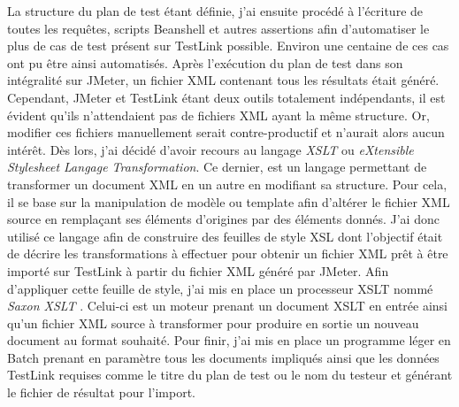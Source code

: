 	La structure du plan de test étant définie, j'ai ensuite procédé à l'écriture de toutes les requêtes, scripts Beanshell et autres assertions afin d'automatiser le plus de cas de test présent sur TestLink possible. Environ une centaine de ces cas ont pu être ainsi automatisés. Après l'exécution du plan de test dans son intégralité sur JMeter, un fichier XML contenant tous les résultats était généré. \\
	
	 Cependant, JMeter et TestLink étant deux outils totalement indépendants, il est évident qu'ils n'attendaient pas de fichiers XML ayant la même structure. Or, modifier ces fichiers manuellement serait contre-productif et n'aurait alors aucun intérêt. Dès lors, j'ai décidé d'avoir recours au langage \textit{XSLT} ou \textit{eXtensible Stylesheet Langage Transformation}. Ce dernier, est un langage permettant de transformer un document XML en un autre en modifiant sa structure. Pour cela, il se base sur la manipulation de modèle ou template afin d'altérer le fichier XML source en remplaçant ses éléments d'origines par des éléments donnés. J'ai donc utilisé ce langage afin de construire des feuilles de style XSL dont l'objectif était de décrire les transformations à effectuer pour obtenir un fichier XML prêt à être importé sur TestLink à partir du fichier XML généré par JMeter. Afin d'appliquer cette feuille de style, j'ai mis en place un processeur XSLT nommé \textit{Saxon XSLT} \cite{bib_saxon}. Celui-ci est un moteur prenant un document XSLT en entrée ainsi qu'un fichier XML source à transformer pour produire en sortie un nouveau document au format souhaité. Pour finir, j'ai mis en place un programme léger en Batch prenant en paramètre tous les documents impliqués ainsi que les données TestLink requises comme le titre du plan de test ou le nom du testeur et générant le fichier de résultat pour l'import.
